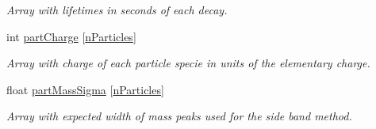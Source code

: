 \begin{DoxyCompactItemize}
\begin{DoxyCompactList}\small\item\em Array with lifetimes in seconds of each decay. \end{DoxyCompactList}\item 
int \hyperlink{classKFPartEfficiencies_a3a6fae7d079f71634024028f88f9f1d7}{part\+Charge} \mbox{[}\hyperlink{classKFPartEfficiencies_a229165eeecbc664b7723d3ce588783e8}{n\+Particles}\mbox{]}\hypertarget{classKFPartEfficiencies_a3a6fae7d079f71634024028f88f9f1d7}{}\label{classKFPartEfficiencies_a3a6fae7d079f71634024028f88f9f1d7}

\begin{DoxyCompactList}\small\item\em Array with charge of each particle specie in units of the elementary charge. \end{DoxyCompactList}\item 
float \hyperlink{classKFPartEfficiencies_a915b3919e4055c50ba1ef2a44a40cd5d}{part\+Mass\+Sigma} \mbox{[}\hyperlink{classKFPartEfficiencies_a229165eeecbc664b7723d3ce588783e8}{n\+Particles}\mbox{]}\hypertarget{classKFPartEfficiencies_a915b3919e4055c50ba1ef2a44a40cd5d}{}\label{classKFPartEfficiencies_a915b3919e4055c50ba1ef2a44a40cd5d}

\begin{DoxyCompactList}\small\item\em Array with expected width of mass peaks used for the side band method. \end{DoxyCompactList}\end{DoxyCompactItemize}
